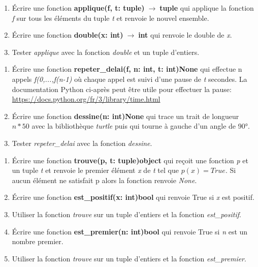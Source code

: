 \documentclass[a4paper,11pt]{article}
\begin{document}
\begin{Form}
\begin{exo}
\begin{enumerate}
\item Écrire une fonction \textbf{applique(f, t: tuple)$\;\rightarrow\;$tuple} qui applique la fonction \emph{f} sur tous les éléments du tuple \emph{t} et renvoie le nouvel ensemble.
\item Écrire une fonction \textbf{double(x: int)$\;\rightarrow\;$int} qui renvoie le double de \emph{x}.
\item Tester \emph{applique} avec la fonction \emph{double} et un tuple d'entiers.
\end{enumerate}
\end{exo}
\begin{exo}
\begin{enumerate}
\item Écrire une fonction \textbf{repeter\_delai(f, n: int, t: int)\;\rightarrow\;None} qui effectue n appels \emph{f(0,...,f(n-1)} où chaque appel est suivi d'une pause de \emph{t} secondes. La documentation Python ci-après peut être utile pour effectuer la pause: \url{https://docs.python.org/fr/3/library/time.html}
\item Écrire une fonction \textbf{dessine(n: int)\;\rightarrow\;None} qui trace un trait de longueur $n*50$ avec la bibliothèque \emph{turtle} puis qui tourne à gauche d'un angle de 90°.
\item Tester \emph{repeter\_delai} avec la fonction \emph{dessine}.
\end{enumerate}
\end{exo}
\begin{exo}
\begin{enumerate}
\item Écrire une fonction \textbf{trouve(p, t: tuple)\;\rightarrow\;object} qui reçoit une fonction \emph{p} et un tuple \emph{t} et renvoie le premier élément \emph{x} de \emph{t} tel que $p(x)=True$. Si aucun élément ne satisfait p alors la fonction renvoie \emph{None}.
\item Écrire une fonction \textbf{est\_positif(x: int)\;\rightarrow\;bool} qui renvoie True si \emph{x} est positif. \item Utiliser la fonction \emph{trouve} sur un tuple d'entiers et la fonction \emph{est\_positif}.
\item Écrire une fonction \textbf{est\_premier(n: int)\;\rightarrow\;bool} qui renvoie True si \emph{n} est un nombre premier.
\item Utiliser la fonction \emph{trouve} sur un tuple d'entiers et la fonction \emph{est\_premier}.

\end{enumerate}
\end{exo}
\end{Form}
\end{document}
